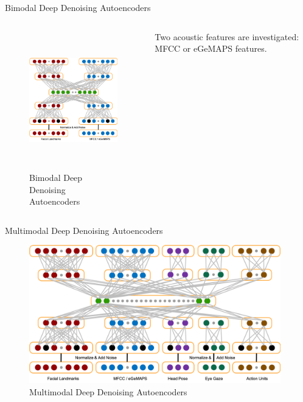 \documentclass{beamer}
\begin{document}
\begin{frame}{Bimodal Deep Denoising Autoencoders}

\begin{columns}

\begin{figure}[ht]
    \centering
    \includegraphics[height=6cm]{images/bimodal_ae.png}
    \caption{Bimodal Deep Denoising Autoencoders}
    \label{fig:bimodal}
\end{figure}


Two acoustic features are investigated: MFCC or eGeMAPS features.

\end{columns}


\end{frame}

\begin{frame}{Multimodal Deep Denoising Autoencoders}

\begin{figure}[ht]
    \centering
    \includegraphics[height=6cm]{images/multimodal_ae.png}
    \caption{Multimodal Deep Denoising Autoencoders}
    \label{fig:multimodal}
\end{figure}

\end{frame}
\end{document}
